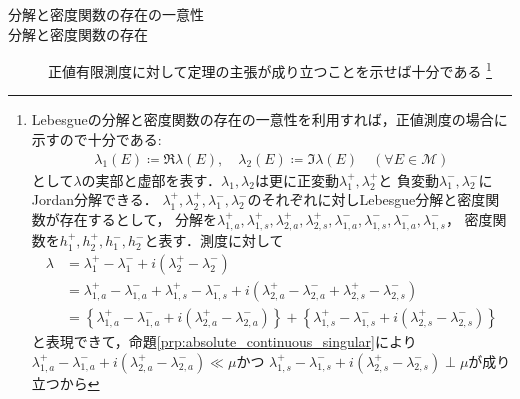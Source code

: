 	\begin{prf}\mbox{}
	\begin{description}
	\item[分解と密度関数の存在の一意性]
		
	\item[分解と密度関数の存在]
		正値有限測度に対して定理の主張が成り立つことを示せば十分である
		\footnote{
			Lebesgueの分解と密度関数の存在の一意性を利用すれば，正値測度の場合に示すので十分である:
			\begin{align}
				\lambda_1(E) \coloneqq \Re{\lambda(E)}, \quad \lambda_2(E) \coloneqq \Im{\lambda(E)} \quad (\forall E \in \mathcal{M})
			\end{align}
			として$\lambda$の実部と虚部を表す．$\lambda_1,\lambda_2$は更に正変動$\lambda_1^+,\lambda_2^+$と
			負変動$\lambda_1^-,\lambda_2^-$にJordan分解できる．
			$\lambda_1^+,\lambda_2^+,\lambda_1^-,\lambda_2^-$のそれぞれに対しLebesgue分解と密度関数が存在するとして，
			分解を$\lambda_{1,a}^+,\lambda_{1,s}^+,\lambda_{2,a}^+,\lambda_{2,s}^+,\lambda_{1,a}^-,\lambda_{1,s}^-,\lambda_{1,a}^-,\lambda_{1,s}^-$，
			密度関数を$h_1^+,h_2^+,h_1^-,h_2^-$と表す．測度に対して
			\begin{align}
				\lambda
				&= \lambda_1^+ - \lambda_1^- + i\left( \lambda_2^+ - \lambda_2^- \right) \\
				&= \lambda_{1,a}^+ - \lambda_{1,a}^- + \lambda_{1,s}^+ - \lambda_{1,s}^-
					+ i\left( \lambda_{2,a}^+ - \lambda_{2,a}^- + \lambda_{2,s}^+ - \lambda_{2,s}^- \right) \\
				&= \left\{ \lambda_{1,a}^+ - \lambda_{1,a}^- + i\left( \lambda_{2,a}^+ - \lambda_{2,a}^- \right) \right\}
					+ \left\{ \lambda_{1,s}^+ - \lambda_{1,s}^- + i\left( \lambda_{2,s}^+ - \lambda_{2,s}^- \right) \right\}
			\end{align}
			と表現できて，命題\ref{prp:absolute_continuous_singular}により
			$\lambda_{1,a}^+ - \lambda_{1,a}^- + i\left( \lambda_{2,a}^+ - \lambda_{2,a}^- \right) \ll \mu$かつ
			$\lambda_{1,s}^+ - \lambda_{1,s}^- + i\left( \lambda_{2,s}^+ - \lambda_{2,s}^- \right) \perp \mu$が成り立つから
			
}
\end{description}
\end{prf}

